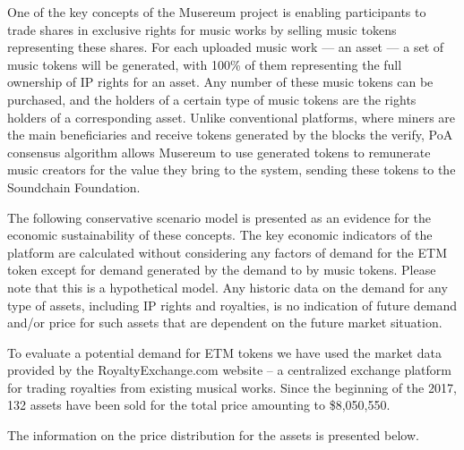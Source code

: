 \documentclass[12pt]{report}
\begin{document}
One of the key concepts of the Musereum project is enabling participants to trade shares in exclusive rights for music works by selling music tokens representing these shares. For each uploaded music work — an asset — a set of music tokens will be generated, with 100\% of them representing the full ownership of IP rights for an asset. Any number of these music tokens can be purchased, and the holders of a certain type of music tokens are the rights holders of a corresponding asset. Unlike conventional platforms, where miners are the main beneficiaries and receive tokens generated by the blocks the verify, PoA consensus algorithm allows Musereum to use generated tokens to remunerate music creators for the value they bring to the system, sending these tokens to the Soundchain Foundation.

The following conservative scenario model is presented as an evidence for the economic sustainability of these concepts. The key economic indicators of the platform are calculated without considering any factors of demand for the ETM token except for demand generated by the demand to by music tokens. Please note that this is a hypothetical model. Any historic data on the demand for any type of assets, including IP rights and royalties, is no indication of future demand and/or price for such assets that are dependent on the future market situation.

To evaluate a potential demand for ETM tokens we have used the market data provided by the RoyaltyExchange.com website – a centralized exchange platform for trading royalties from existing musical works. Since the beginning of the 2017, 132 assets have been sold for the total price amounting to \$8,050,550.

The information on the price distribution for the assets is presented below.
\end{document}
